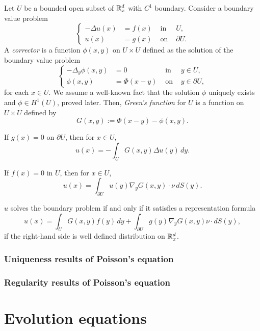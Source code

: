 \documentclass{../note}
\begin{document}
\begin{prb}
Let $U$ be a bounded open subset of $\mathbb{R}_x^d$ with $C^1$ boundary.
Consider a boundary value problem
\[\left\{\begin{alignedat}{2}
-\Delta u(x)&=f(x) & \text{ in }&U,\\
u(x)&=g(x) & \text{ on }&\partial U.
\end{alignedat}\right.\]
A \emph{corrector} is a function $\phi(x,y)$ on $U\times U$ defined as the solution of the boundary value problem
\[\left\{\begin{alignedat}{2}
-\Delta_y\phi(x,y)&=0 & \text{ in }&y\in U,\\
\phi(x,y)&=\Phi(x-y) & \text{ on }&y\in\partial U,
\end{alignedat}\right.\]
for each $x\in U$.
We assume a well-known fact that the solution $\phi$ uniquely exists and $\phi\in H^1(U)$, proved later.
Then, \emph{Green's function} for $U$ is a function on $U\times U$ defined by
\[G(x,y):=\Phi(x-y)-\phi(x,y).\]
\begin{parts}
\item If $g(x)=0$ on $\partial U$, then for $x\in U$,
\[u(x)=-\int_UG(x,y)\Delta u(y)\,dy.\]
\item If $f(x)=0$ in $U$, then for $x\in U$,
\[u(x)=\int_{\partial U}u(y)\nabla_yG(x,y)\cdot\nu\,dS(y).\]
\item $u$ solves the boundary problem if and only if it satisfies a representation formula
\[u(x)=\int_UG(x,y)f(y)\,dy+\int_{\partial U}g(y)\nabla_yG(x,y)\nu\cdot dS(y),\]
if the right-hand side is well defined distribution on $\mathbb{R}_x^d$.
\end{parts}
\end{prb}
\begin{pf}
\end{pf}

\section{Uniqueness results of Poisson's equation}

\section{Regularity results of Poisson's equation}




\part{Evolution equations}
\end{document}
